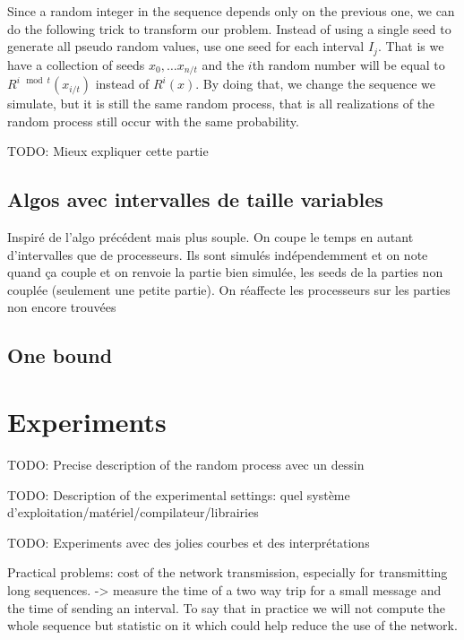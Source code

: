 \documentclass[a4paper,10pt]{article}
\newcommand{\todo}[1]{{\color{red} TODO: {#1}}}
\begin{document}
Since a random integer in the sequence depends only on the previous one, we can do the following trick to transform our problem.
Instead of using a single seed to generate all pseudo random values, use one seed for each interval $I_j$.
That is we have a collection of seeds $x_0, \dots x_{n/t}$ and the $i$th random number will be equal to 
$R^{i \mod t}(x_{i/t})$ instead of $R^i(x)$.
By doing that, we change the sequence we simulate, but it is still the same random process, that is all realizations
of the random process still occur with the same probability. 

\todo{Mieux expliquer cette partie}

\subsection{Algos avec intervalles de taille variables}

Inspiré de l'algo précédent mais plus souple. 
On coupe le temps en autant d'intervalles que de processeurs.
Ils sont simulés indépendemment et on note quand ça couple et on renvoie
la partie bien simulée, les seeds de la parties non couplée (seulement une petite partie). 
On réaffecte les processeurs sur les parties non encore trouvées


\subsection{One bound}


\section{Experiments}


\todo{ Precise description of the random process avec un dessin}

\todo{Description of the experimental settings: quel système d'exploitation/matériel/compilateur/librairies}

\todo{Experiments avec des jolies courbes et des interprétations}


Practical problems: cost of the network transmission, especially for transmitting long sequences.
-> measure the time of a two way trip for a small message and the time of sending an interval.
To say that in practice we will not compute the whole sequence but statistic on it which could help
reduce the use of the network.
\end{document}
